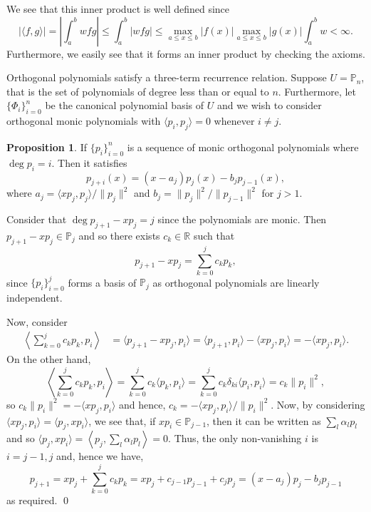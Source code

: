 \documentclass[
]{article}
\theoremstyle{definition}
\newtheorem{prop}{Proposition}
\theoremstyle{definition}
\begin{document}
We see that this inner product is well defined since
\[|\langle f, g \rangle| = \left| \int_a^b w f g \right| 
      \le \int_a^b |w f g| \le 
      \max_{a \le x \le b}|f(x)| \max_{a \le x \le b}|g(x)|\int_a^b w < \infty.\]
Furthermore, we easily see that it forms an inner product by checking
the axioms.

Orthogonal polynomials satisfy a three-term recurrence relation. Suppose
\(U = \mathbb{P}_n\), that is the set of polynomials of degree less than
or equal to \(n\). Furthermore, let \(\{\Phi_i\}_{i = 0}^n\) be the
canonical polynomial basis of \(U\) and we wish to consider orthogonal
monic polynomials with \(\langle p_i, p_j \rangle = 0\) whenever
\(i \neq j\).

\begin{prop}
  If \(\{p_i\}_{i = 0}^{n}\) is a sequence of monic orthogonal polynomials where 
  \(\deg p_i = i\). Then it satisfies 
  \[p_{j + i}(x) = (x - a_j) p_j(x) - b_j p_{j - 1}(x),\]
  where \(a_j = \langle xp_j, p_j \rangle / \|p_j\|^2\) and 
  \(b_j = \|p_j\|^2 / \|p_{j - 1}\|^2\) for \(j > 1\).
\end{prop}
\proof

Consider that \(\deg p_{j + 1} - xp_j = j\) since the polynomials are
monic. Then \(p_{j + 1} - xp_j \in \mathbb{P}_j\) and so there exists
\(c_k \in \mathbb{R}\) such that
\[p_{j + 1} - xp_j = \sum_{k = 0}^j c_k p_k,\] since
\(\{p_i\}_{i = 0}^j\) forms a basis of \(\mathbb{P}_j\) as orthogonal
polynomials are linearly independent.

Now, consider \[\begin{split}
    \left\langle \sum_{k = 0}^j c_k p_k, p_i \right\rangle 
      & = \langle p_{j + 1} - xp_j, p_i \rangle 
        = \langle p_{j + 1}, p_i \rangle - \langle xp_j, p_i \rangle
        = - \langle xp_j, p_i \rangle.
  \end{split}\] On the other hand,
\[\left\langle \sum_{k = 0}^j c_k p_k, p_i \right\rangle 
    = \sum_{k = 0}^j c_k \langle p_k, p_i \rangle 
    = \sum_{k = 0}^j c_k \delta_{ki} \langle p_i, p_i \rangle = c_k \|p_i\|^2, \]
so \(c_k\|p_i\|^2 = - \langle xp_j, p_i \rangle\) and hence,
\(c_k = - \langle xp_j, p_i \rangle / \|p_i\|^2\). Now, by considering
\(\langle xp_j, p_i \rangle = \langle p_j, xp_i \rangle\), we see that,
if \(xp_i \in \mathbb{P}_{j - 1}\), then it can be written as
\(\sum_l \alpha_l p_l\) and so
\(\langle p_j, xp_i \rangle = \left\langle p_j, \sum_l \alpha_l p_l \right\rangle = 0\).
Thus, the only non-vanishing \(i\) is \(i = j - 1, j\) and, hence we
have, \[p_{j + 1} = xp_j + \sum_{k = 0}^j c_k p_k = 
    xp_j + c_{j - 1}p_{j - 1} + c_j p_j = (x - a_j) p_j - b_j p_{j - 1}\]
as required. \qed
\end{document}
